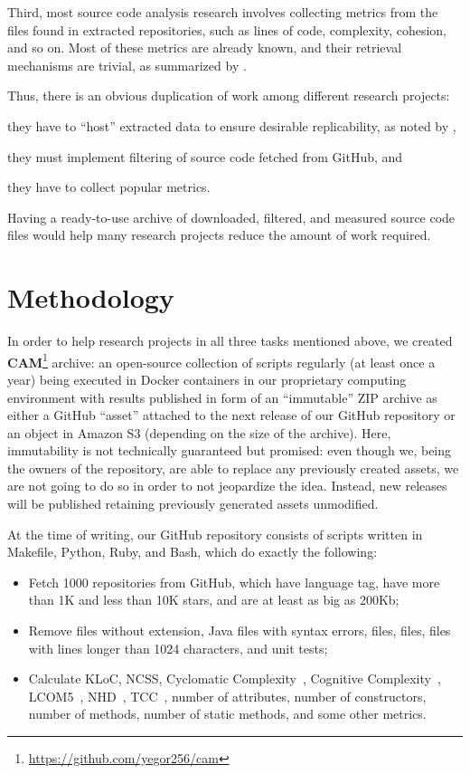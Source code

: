 \documentclass[11pt,sigplan,nonacm]{acmart}
\newcommand\cam{{\sffamily\bfseries CAM}}
\begin{document}
Third, most source code analysis research involves collecting metrics from the files found in extracted repositories, such as lines of code, complexity, cohesion, and so on. Most of these metrics are already known, and their retrieval mechanisms are trivial, as summarized by \citet{nunez2017source}.

Thus, there is an obvious duplication of work among different research projects:
\begin{inparaenum}[(a)]
\item they have to ``host'' extracted data to ensure desirable replicability, as noted by \citet{7887704},
\item they must implement filtering of source code fetched from GitHub, and
\item they have to collect popular metrics.
\end{inparaenum}
Having a ready-to-use archive of downloaded, filtered, and measured source code files would help many research projects reduce the amount of work required.

\section{Methodology}

In order to help research projects in all three tasks mentioned above, we created \cam{}\footnote{\url{https://github.com/yegor256/cam}} archive: an open-source collection of scripts regularly (at least once a year) being executed in Docker containers in our proprietary computing environment with results published in form of an ``immutable'' ZIP archive as either a GitHub ``asset'' attached to the next release of our GitHub repository or an object in Amazon S3 (depending on the size of the archive). Here, immutability is not technically guaranteed but promised: even though we, being the owners of the repository, are able to replace any previously created assets, we are not going to do so in order to not jeopardize the idea. Instead, new releases will be published retaining previously generated assets unmodified.

At the time of writing, our GitHub repository consists of scripts written in Makefile, Python, Ruby, and Bash, which do exactly the following:
\begin{itemize}
    \item Fetch 1000 repositories from GitHub, which have  language tag, have more than 1K and less than 10K stars, and are at least as big as 200Kb;
    \item Remove files without  extension, Java files with syntax errors,  files,  files, files with lines longer than 1024 characters, and unit tests;
    \item Calculate KLoC, NCSS, Cyclomatic Complexity~\citep{mccabe1976complexity}, Cognitive Complexity~\citep{campbell2018cognitive}, LCOM5~\citep{henderson1996coupling}, NHD~\citep{counsell2006interpretation}, TCC~\citep{bieman1995cohesion}, number of attributes, number of constructors, number of methods, number of static methods, and some other metrics.
\end{itemize}
\end{document}
